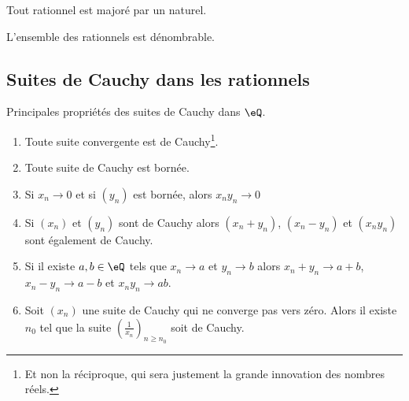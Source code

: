\begin{lemma} \label{LEMooEBTIooGMoHsj}
    Tout rationnel est majoré par un naturel.
\end{lemma}

\begin{proposition}     \label{PROPooDHIAooZysvNs}
    L'ensemble des rationnels est dénombrable.
\end{proposition}

\subsection{Suites de Cauchy dans les rationnels}

\begin{proposition}        \label{PropFFDJooAapQlP}
    Principales propriétés des suites de Cauchy dans \( \eQ\).
    \begin{enumerate}
        \item       \label{ItemRKCIooJguHdji}
            Toute suite convergente est de Cauchy\footnote{Et non la réciproque, qui sera justement la grande innovation des nombres réels.}.
        \item       \label{ItemRKCIooJguHdjii}
            Toute suite de Cauchy est bornée.
        \item       \label{ItemRKCIooJguHdjiii}
            Si \( x_n\to 0\) et si \( (y_n)\) est bornée, alors \( x_ny_n\to 0\)
        \item
            Si \( (x_n)\) et \( (y_n)\) sont de Cauchy alors \( (x_n+y_n)\), \( (x_n-y_n)\) et \( (x_ny_n)\) sont également de Cauchy.
        \item       \label{ITEMooIAFSooAIUpAN}
            Si il existe \( a,b\in \eQ\) tels que \( x_n\to a \) et \( y_n\to b \) alors \( x_n+y_n\to a+b\), \( x_n-y_n\to a-b\) et \(  x_ny_n\to ab  \).
        \item   \label{ItemRKCIooJguHdjvi}
            Soit \( (x_n)\) une suite de Cauchy qui ne converge pas vers zéro. Alors il existe \( n_0\) tel que la suite \( \left( \frac{1}{ x_n } \right)_{n\geq n_0}\) soit de Cauchy.
    \end{enumerate}
\end{proposition}

